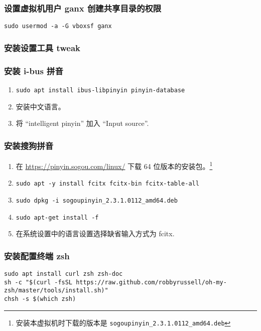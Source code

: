 \documentclass[
    11pt,
    base=hide,
    cite=authoryear,
    device=phone,
    lang=cn,
    mode=simple,
    result=answer,
    toc=onecol,
]{elegantbook_sierxue}
\begin{document}
\subsubsection{设置虚拟机用户 ganx 创建共享目录的权限}%
\label{ssub:vbox-ganx-vboxsf}
\lstinline{sudo usermod -a -G vboxsf ganx}

\subsubsection{安装设置工具 tweak}%
\label{ssub:vm-treak}


\subsubsection{安装 i-bus 拼音}%
\label{ssub:pinyin-i-bus}
\begin{enumerate}
    \item \lstinline{sudo apt install ibus-libpinyin pinyin-database}
    \item 安装中文语言。
    \item 将 ``intelligent pinyin'' 加入 ``Input source''.
\end{enumerate}

\subsubsection{安装搜狗拼音}%
\label{ssub:pinyin-sogou}
\begin{enumerate}
    \item 在 \href{https://pinyin.sogou.com/linux/}
        {https://pinyin.sogou.com/linux/} 下载 64 位版本的安装包。\footnote{
            安装本虚拟机时下载的版本是
            \lstinline{sogoupinyin_2.3.1.0112_amd64.deb}
        }
    \item \lstinline{sudo apt -y install fcitx fcitx-bin fcitx-table-all}
    \item \lstinline{sudo dpkg -i sogoupinyin_2.3.1.0112_amd64.deb}
    \item \lstinline{sudo apt-get install -f}
    \item 在系统设置中的语言设置选择缺省输入方式为 fcitx.
\end{enumerate}

\subsubsection{安装配置终端 zsh}%
\label{ssub:vm-zsh}

\begin{lstlisting}[style=lst]
sudo apt install curl zsh zsh-doc
sh -c "$(curl -fsSL https://raw.github.com/robbyrussell/oh-my-zsh/master/tools/install.sh)"
chsh -s $(which zsh)
\end{lstlisting}
\end{document}
